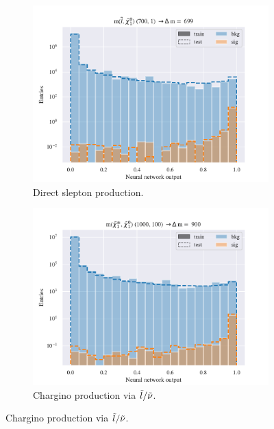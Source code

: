 \begin{figure}[H]
    \centering
    \begin{subfigure}[t!]{0.49\textwidth}
        \includegraphics[width = \textwidth]{Figures/SlepSlep/ML/NN/All_level/High/scaled_train_test_396033.pdf}
        \caption{Direct slepton production.}
        \label{fig:SlepslepNNLow}
    \end{subfigure}
    \begin{subfigure}[t!]{0.49\textwidth}
        \includegraphics[width = \textwidth]{Figures/SlepSnu/NN/All_level/High/scaled_train_test_397169.pdf}
        \caption{Chargino production via $\Tilde{l}/\Tilde{\nu}$.}
        \label{fig:SlepsnuNNLow}
    \end{subfigure}    

\end{figure}
